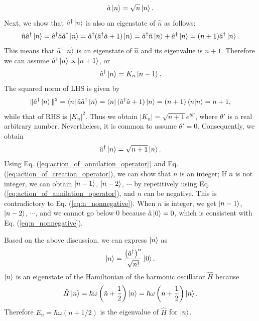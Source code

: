\documentclass{book}
\begin{document}
\begin{equation}
  \hat a\ket n = \sqrt n \ket n.
  \label{eq:action_of_annilation_operator}
\end{equation}
Next, we show that $\hat a^\dagger\ket n$ is also an eigenstate of $\hat n$ as follows: 
\begin{equation}
  \hat n \hat a^\dagger \ket n = \hat a^\dagger \hat a \hat a^\dagger \ket n = \hat a^\dagger (\hat a^\dagger \hat a + 1)\ket n = \hat a^\dagger \hat n\ket n + \hat a^\dagger \ket n = (n + 1)\hat a^\dagger \ket n.
\end{equation}
This means that $\hat a^\dagger \ket n$ is an eigenstate of $\hat n$ and its eigenvalue is $n+1$. Therefore we can assume $\hat a^\dagger\ket n \propto \ket {n+1}$, or 
\begin{equation}
  \hat a^\dagger\ket n = K_n\ket{n-1}.
\end{equation}
The squared norm of LHS is given by
\begin{equation}
  \| \hat a^\dagger \ket n\|^2 = \bra n \hat a \hat a^\dagger \ket n = \bra n (\hat a^\dagger \hat a + 1) \ket n = (n+1)\braket{n|n} = n+1,
\end{equation}
while that of RHS is $|K_n|^2$. Thus we obtain $|K_n| = \sqrt {n+1} e^{i\theta'}$, where $\theta'$ is a real arbitrary number. Nevertheless, it is common to assume $\theta' = 0$. Consequently, we obtain
\begin{equation}
  \hat a^\dagger\ket n = \sqrt {n+1} \ket n.
  \label{eq:action_of_creation_operator}
\end{equation}
Using Eq. (\ref{eq:action_of_annilation_operator}) and Eq. (\ref{eq:action_of_creation_operator}), we can show that $n$ is an integer; If $n$ is not integer, we can obtain $\ket{n-1}$, $\ket{n-2}$, $\cdots$ by repetitively using Eq. (\ref{eq:action_of_annilation_operator}), and $n$ can be negative. This is contradictory to Eq. (\ref{eq:n_nonnegative}). When $n$ is integer, we get $\ket{n - 1}$, $\ket{n - 2}$, $\cdots$, and we cannot go below 0 because $\hat a \ket 0 = 0$, which is consistent with Eq. (\ref{eq:n_nonnegative}).

Based on the above discussion, we can express $\ket n$ as
\begin{equation}
  \ket n = \frac{\left(\hat a^\dagger\right)^n}{\sqrt{n!}}\ket 0.
\end{equation}
$\ket n$ is an eigenstate of the Hamiltonian of the harmonic oscillator $\hat H$ because
\begin{equation}
  \hat H \ket n = \hbar \omega \left(\hat n + \frac 1 2 \right)\ket n =  \hbar \omega \left(n + \frac 1 2 \right)\ket n.
\end{equation}
Therefore $E_n = \hbar \omega (n + 1/2)$ is the eigenvalue of $\hat H$ for $\ket n$.
\end{document}
